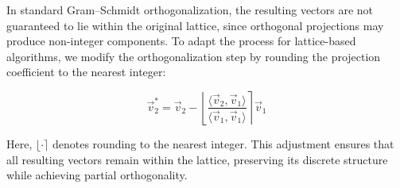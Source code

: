 \documentclass[a4paper,12pt]{article}
\begin{document}
\vspace{1em}
In standard Gram--Schmidt orthogonalization, the resulting vectors are not guaranteed to lie within the original lattice, since orthogonal projections may produce non-integer components. To adapt the process for lattice-based algorithms, we modify the orthogonalization step by rounding the projection coefficient to the nearest integer:

\[
\vec{v}_2^\ast = \vec{v}_2 - \left\lfloor \frac{\langle \vec{v}_2, \vec{v}_1 \rangle}{\langle \vec{v}_1, \vec{v}_1 \rangle} \right\rceil \vec{v}_1
\]

Here, \( \lfloor \cdot \rceil \) denotes rounding to the nearest integer. This adjustment ensures that all resulting vectors remain within the lattice, preserving its discrete structure while achieving partial orthogonality.
\end{document}
